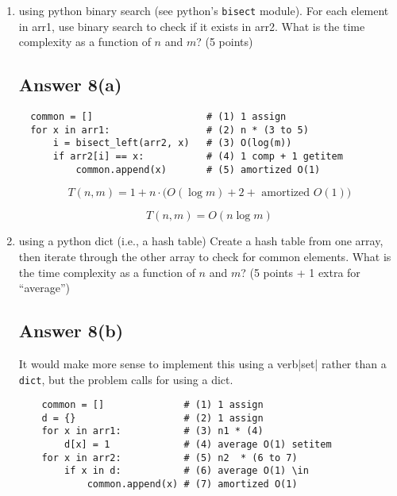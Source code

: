 \documentclass{article}
\begin{document}
\begin{enumerate}[label=(\alph*)]

\item using python binary search (see python's \verb|bisect| module).  For each element in arr1, use binary search to check if it exists in arr2.  What is
  the time complexity as a function of $n$ and $m$? (5 points)

\subsection*{Answer 8(a)}

\begin{verbatim}
  common = []                    # (1) 1 assign
  for x in arr1:                 # (2) n * (3 to 5)
      i = bisect_left(arr2, x)   # (3) O(log(m)) 
      if arr2[i] == x:           # (4) 1 comp + 1 getitem
          common.append(x)       # (5) amortized O(1)
\end{verbatim}

\begin{equation*}
  T(n, m) = 1 + n \cdot \bigg(O(\log m) + 2
  + \text{ amortized } O(1)\bigg) 
\end{equation*}

\begin{equation*}
  \boxed{T(n, m) = O(n \log m)}
\end{equation*}

\item using a python dict (i.e., a hash table) Create a hash table
  from one array, then iterate through the other array to check for
  common elements.  What is the time complexity as a function of $n$
  and $m$? (5 points + 1 extra for ``average'')

\subsection*{Answer 8(b)}

It would make more sense to implement this using a
verb|set| rather than a \verb|dict|, but the problem calls for using
a dict.

\begin{verbatim}
    common = []              # (1) 1 assign
    d = {}                   # (2) 1 assign
    for x in arr1:           # (3) n1 * (4)
        d[x] = 1             # (4) average O(1) setitem
    for x in arr2:           # (5) n2  * (6 to 7)
        if x in d:           # (6) average O(1) \in
            common.append(x) # (7) amortized O(1)
\end{verbatim}


\end{enumerate}
\end{document}

